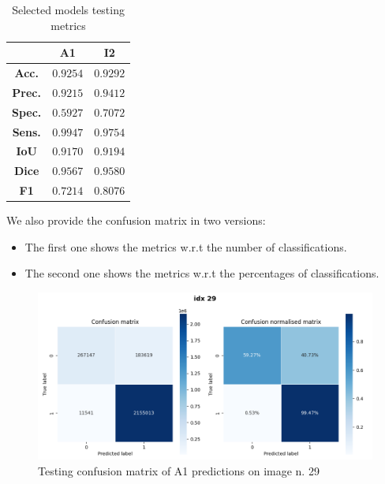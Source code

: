 \begin{table}[H]
\centering
\begin{tabular}{|c|c|c|}
\hline
& \textbf{A1} & \textbf{I2}
\\ \hline \hline
\textbf{Acc.} & \textcolor{myred}{$0.9254$} & \textcolor{mygreen}{$0.9292$}
\\ \hline
\textbf{Prec.} & \textcolor{myred}{$0.9215$} & \textcolor{mygreen}{$0.9412$}
\\ \hline
\textbf{Spec.} & \textcolor{myred}{$0.5927$} & \textcolor{mygreen}{$0.7072$}
\\ \hline
\textbf{Sens.} & \textcolor{mygreen}{$0.9947$} & \textcolor{myred}{$0.9754$}
\\ \hline
\textbf{IoU} & \textcolor{myred}{$0.9170$} & \textcolor{mygreen}{$0.9194$}
\\ \hline
\textbf{Dice} & \textcolor{myred}{$0.9567$} & \textcolor{mygreen}{$0.9580$}
\\ \hline
\textbf{F1} & \textcolor{myred}{$0.7214$} & \textcolor{mygreen}{$0.8076$}
\\ \hline
\end{tabular}
\caption{Selected models testing metrics}
\end{table}

We also provide the confusion matrix in two versions:
\begin{itemize}
    \item The first one shows the metrics w.r.t the number of classifications.
    \item The second one shows the metrics w.r.t the percentages of classifications.
\end{itemize}

\begin{figure}[H]
 \centering
 \includegraphics[scale=0.6, cframe=bluepoli 2pt]{./resources/A1_conf_matr_29.png}
 \caption[A1 test confusion matrix]
    {Testing confusion matrix of A1 predictions on image n. 29}
\end{figure}

